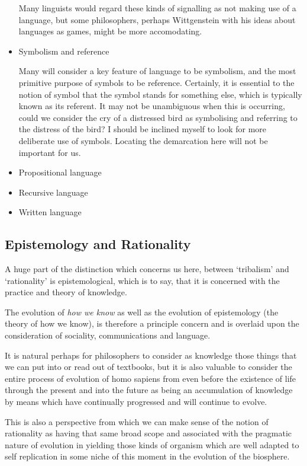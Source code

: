\documentclass[10pt,titlepage]{article}
\begin{document}
\begin{itemize}
  Many linguists would regard these kinds of signalling as not making use of a language, but some philosophers, perhaps Wittgenstein with his ideas about languages as games, might be more accomodating.
  
\item Symbolism and reference

  Many will consider a key feature of language to be symbolism, and the most primitive purpose of symbols to be reference.
  Certainly, it is essential to the notion of symbol that the symbol stands for something else, which is typically known as its referent.
  It may not be unambiguous when this is occurring, could we consider the cry of a distressed bird as symbolising and referring to the distress of the bird?
  I should be inclined myself to look for more deliberate use of symbols.
  Locating the demarcation here will not be important for us.

\item Propositional language

\item Recursive language

\item Written language
  
 
\end{itemize}

\subsection{Epistemology and Rationality}

A huge part of the distinction which concerns us here, between `tribalism' and `rationality' is epistemological, which is to say, that it is concerned with the practice and theory of knowledge.

The evolution of \emph{how we know} as well as the evolution of epistemology (the theory of how we know), is therefore a principle concern and is overlaid upon the consideration of sociality, communications and language.

It is natural perhaps for philosophers to consider as knowledge those things that we can put into or read out of textbooks, but it is also valuable to consider the entire process of evolution of homo sapiens from even before the existence of life through the present and into the future as being an accumulation of knowledge by means which have continually progressed and will continue to evolve.

This is also a perspective from which we can make sense of the notion of rationality as having that same broad scope and associated with the pragmatic nature of evolution in yielding those kinds of organism which are well adapted to self replication in some niche of this moment in the evolution of the biosphere.
\end{document}
